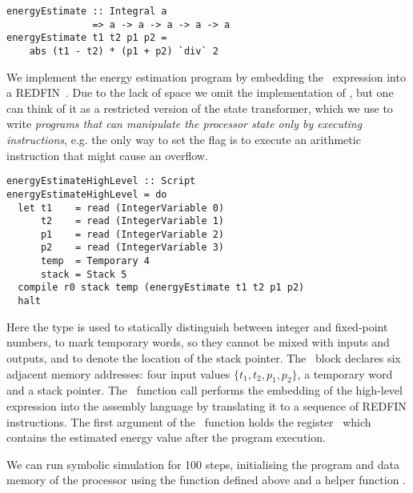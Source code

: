 
\begin{verbatim}
energyEstimate :: Integral a
               => a -> a -> a -> a -> a
energyEstimate t1 t2 p1 p2 =
    abs (t1 - t2) * (p1 + p2) `div` 2
\end{verbatim}


\noindent
We implement the energy estimation program by embedding the~
expression into a REDFIN~. Due to the lack of space we omit the
implementation of , but one can think of it as a restricted version
of the  state transformer, which we use to write \emph{programs that
can manipulate the processor state only by executing instructions}, e.g. the
only way to set the  flag is to execute an arithmetic instruction
that might cause an overflow.

\begin{verbatim}
energyEstimateHighLevel :: Script
energyEstimateHighLevel = do
  let t1    = read (IntegerVariable 0)
      t2    = read (IntegerVariable 1)
      p1    = read (IntegerVariable 2)
      p2    = read (IntegerVariable 3)
      temp  = Temporary 4
      stack = Stack 5
  compile r0 stack temp (energyEstimate t1 t2 p1 p2)
  halt
\end{verbatim}
\label{energyEstimateHighLevel}

\noindent
Here the type  is used to statically distinguish between integer
and fixed-point numbers,  to mark temporary words, so they cannot
be mixed with inputs and outputs, and  to denote the location of the
stack pointer. The~ block declares six adjacent memory addresses: four
input values $\{t_1, t_2, p_1, p_2\}$, a temporary word and a stack pointer.
The~ function call performs the embedding of the high-level
 expression into the assembly language by translating it to a
sequence of REDFIN instructions. The first argument of the~ function
holds the register~ which contains the estimated energy value after the
program execution.

We can run symbolic simulation for 100 steps, initialising the program and data
memory of the processor using the function  defined above and a
helper function .

